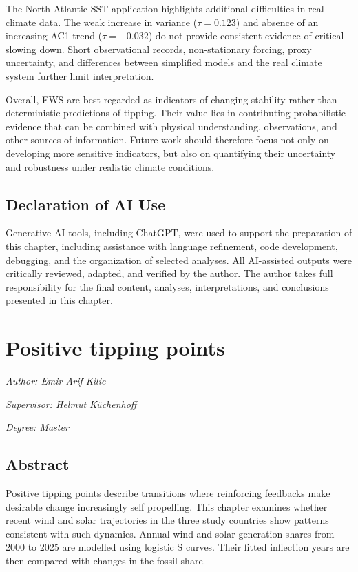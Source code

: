 \documentclass[
]{krantz}
\begin{document}
The North Atlantic SST application highlights additional difficulties in real climate data. The weak increase in variance (\(\tau=0.123\)) and absence of an increasing AC1 trend (\(\tau=-0.032\)) do not provide consistent evidence of critical slowing down. Short observational records, non-stationary forcing, proxy uncertainty, and differences between simplified models and the real climate system further limit interpretation.

Overall, EWS are best regarded as indicators of changing stability rather than deterministic predictions of tipping. Their value lies in contributing probabilistic evidence that can be combined with physical understanding, observations, and other sources of information. Future work should therefore focus not only on developing more sensitive indicators, but also on quantifying their uncertainty and robustness under realistic climate conditions.

\section{Declaration of AI Use}\label{declaration-of-ai-use}

Generative AI tools, including ChatGPT, were used to support the preparation of this chapter, including assistance with language refinement, code development, debugging, and the organization of selected analyses. All AI-assisted outputs were critically reviewed, adapted, and verified by the author. The author takes full responsibility for the final content, analyses, interpretations, and conclusions presented in this chapter.

\chapter{Positive tipping points}\label{ptp}

\emph{Author: Emir Arif Kilic}

\emph{Supervisor: Helmut Küchenhoff}

\emph{Degree: Master}

\section*{Abstract}\label{abstract-7}


Positive tipping points describe transitions where reinforcing feedbacks make desirable change increasingly self propelling. This chapter examines whether recent wind and solar trajectories in the three study countries show patterns consistent with such dynamics. Annual wind and solar generation shares from 2000 to 2025 are modelled using logistic S curves. Their fitted inflection years are then compared with changes in the fossil share.
\end{document}
